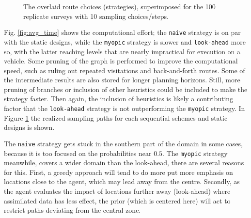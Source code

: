 \documentclass[aoas]{imsart}
\begin{document}
\begin{figure}[!b]
  \hfill
  \hfill
  \caption{The overlaid route choices (strategies), superimposed for
    the 100 replicate surveys with 10 sampling choices/steps.}
\label{fig:route_choices}
\end{figure}

Fig.  \ref{fig:avg_time} shows the computational effort; the \texttt{naive} strategy is on par with the static designs, while the \texttt{myopic} strategy is slower and \texttt{look-ahead} more so, with the latter reaching levels that are nearly impractical for execution on a vehicle. Some pruning of the graph is performed to improve the computational speed, such as ruling out repeated visitations and back-and-forth routes. Some of the intermediate results are also stored for longer planning horizons. Still, more pruning of branches or inclusion of other heuristics could be included to make the strategy faster. Then again, the inclusion of heuristics is likely a contributing factor that the \texttt{look-ahead} strategy is not outperforming the \texttt{myopic} strategy. In Figure \ref{fig:route_choices} the realized sampling paths for each sequential schemes and static designs is shown.  

The \texttt{naive} strategy gets stuck in the southern part of the domain in some cases, because it is too focused on the probabilities near $0.5$. The \texttt{myopic} strategy meanwhile, covers a wider domain than the look-ahead, there are several reasons for this. First, a greedy approach will tend to do more put more emphasis on locations close to the agent, which may lead away from the centre. Secondly, as the agent evaluates the impact of locations further away (look-ahead) where assimilated data has less effect, the prior (which is centered here) will act to restrict paths deviating from the central zone.   
\end{document}
